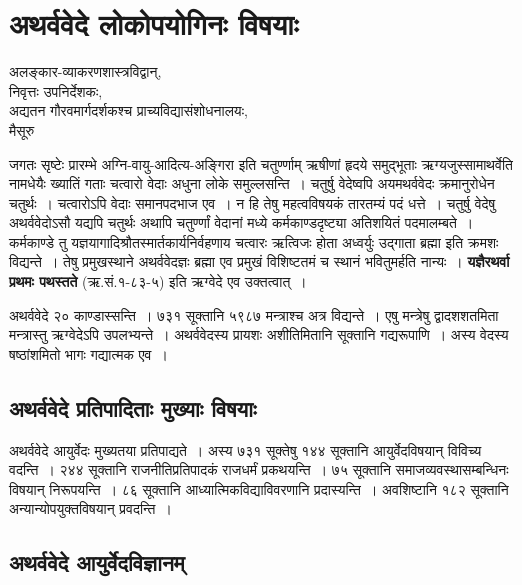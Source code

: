 \chapter{अथर्ववेदे लोकोपयोगिनः विषयाः}

\begin{center}
\smallskip

अलङ्कार-व्याकरणशास्त्रविद्वान्,\\ 
निवृत्तः उपनिर्देशकः, \\
अद्यतन गौरवमार्गदर्शकश्च प्राच्यविद्यासंशोधनालयः,\\
मैसूरु
\end{center}


जगतः सृष्टेः प्रारम्भे अग्नि-वायु-आदित्य-अङ्गिरा इति चतुर्ण्णाम् ऋषीणां हृदये समुद्भूताः ऋग्यजुस्सामाथर्वेति नामधेयैः ख्यातिं गताः चत्वारो वेदाः अधुना लोके समुल्लसन्ति~। चतुर्षु वेदेष्वपि अयमथर्ववेदः क्रमानुरोधेन चतुर्थः~। चत्वारोऽपि वेदाः समानपदभाज एव~। न हि तेषु महत्वविषयकं तारतम्यं पदं धत्ते~। चतुर्षु वेदेषु अथर्ववेदोऽसौ यद्यपि चतुर्थः अथापि चतुर्ण्णां वेदानां मध्ये कर्मकाण्डदृष्ट्या अतिशयितं पदमालम्बते~। कर्मकाण्डे तु यज्ञयागादिश्रौतस्मार्तकार्यनिर्वहणाय चत्वारः ऋत्विजः होता अध्वर्युः उद्गाता ब्रह्मा इति क्रमशः विद्यन्ते~। तेषु प्रमुखस्थाने अथर्ववेदज्ञः ब्रह्मा एव प्रमुखं विशिष्टतमं च स्थानं भवितुमर्हति नान्यः~। \textbf{यज्ञैरथर्वा प्रथमः पथस्तते} (ऋ.सं.१-८३-५) इति ऋग्वेदे एव उक्तत्वात्~।

अथर्ववेदे २० काण्डास्सन्ति~। ७३१ सूक्तानि ५९८७ मन्त्राश्च अत्र विद्यन्ते~। एषु मन्त्रेषु द्वादशशतमिता मन्त्रास्तु ऋग्वेदेऽपि उपलभ्यन्ते~। अथर्ववेदस्य प्रायशः अशीतिमितानि सूक्तानि गद्यरूपाणि~। अस्य वेदस्य षष्ठांशमितो भागः गद्यात्मक एव~।

\section*{अथर्ववेदे प्रतिपादिताः मुख्याः विषयाः}

अथर्ववेदे आयुर्वेदः मुख्यतया प्रतिपाद्यते~। अस्य ७३१ सूक्तेषु १४४ सूक्तानि आयुर्वेदविषयान् विविच्य वदन्ति~। २४४ सूक्तानि राजनीतिप्रतिपादकं राजधर्मं प्रकथयन्ति~। ७५ सूक्तानि समाजव्यवस्थासम्बन्धिनः विषयान् निरूपयन्ति~। ८६ सूक्तानि आध्यात्मिकविद्याविवरणानि प्रदास्यन्ति~। अवशिष्टानि १८२ सूक्तानि अन्यान्योपयुक्तविषयान् प्रवदन्ति~।

\section*{अथर्ववेदे आयुर्वेदविज्ञानम्}

